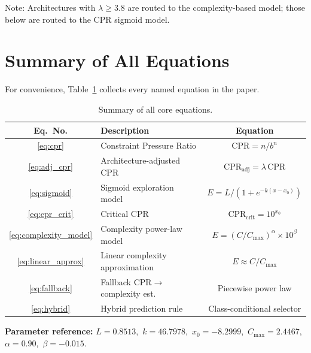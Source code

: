 \documentclass[12pt,a4paper]{article}
\begin{document}
\noindent Note: Architectures with $\lambda \geq 3.8$ are routed to the complexity-based model; those below are routed to the CPR sigmoid model.


\section{Summary of All Equations}\label{app:equations}

For convenience, Table~\ref{tab:equation_summary} collects every named equation in the paper.

\begin{table}[ht]
\centering
\caption{Summary of all core equations.}
\label{tab:equation_summary}
\begin{tabular}{clc}
\toprule
Eq.\ No. & Description & Equation \\
\midrule
\eqref{eq:cpr}              & Constraint Pressure Ratio       & $\mathrm{CPR} = n/b^{n}$ \\[4pt]
\eqref{eq:adj_cpr}          & Architecture-adjusted CPR        & $\mathrm{CPR}_{\text{adj}} = \lambda\,\mathrm{CPR}$ \\[4pt]
\eqref{eq:sigmoid}          & Sigmoid exploration model        & $E = L/(1+e^{-k(x-x_0)})$ \\[4pt]
\eqref{eq:cpr_crit}         & Critical CPR                     & $\mathrm{CPR}_{\text{crit}} = 10^{x_0}$ \\[4pt]
\eqref{eq:complexity_model} & Complexity power-law model       & $E = (C/C_{\max})^{\alpha}\times10^{\beta}$ \\[4pt]
\eqref{eq:linear_approx}    & Linear complexity approximation  & $E \approx C/C_{\max}$ \\[4pt]
\eqref{eq:fallback}         & Fallback CPR$\to$complexity est. & Piecewise power law \\[4pt]
\eqref{eq:hybrid}           & Hybrid prediction rule           & Class-conditional selector \\
\bottomrule
\end{tabular}
\end{table}

\bigskip
\noindent\textbf{Parameter reference:}
$L = 0.8513$,\ $k = 46.7978$,\ $x_{0} = -8.2999$,\ $C_{\max} = 2.4467$,\ $\alpha = 0.90$,\ $\beta = -0.015$.
\end{document}
